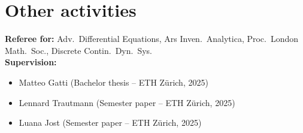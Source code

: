 \documentclass[a4paper,11pt]{article}
\begin{document}
\section*{Other activities}
\noindent
\textbf{Referee for:} Adv.\ Differential Equations, Ars Inven.\ Analytica, Proc.\ London Math.\ Soc., Discrete Contin.\ Dyn.\ Sys.\\
 
\noindent
\textbf{Supervision:} 
\begin{itemize}
	\item Matteo Gatti (Bachelor thesis -- ETH Z\"urich, 2025)
	\item Lennard Trautmann (Semester paper -- ETH Z\"urich, 2025)
	\item Luana Jost (Semester paper -- ETH Z\"urich, 2025)
\end{itemize}
\vspace{5mm}
\end{document}
